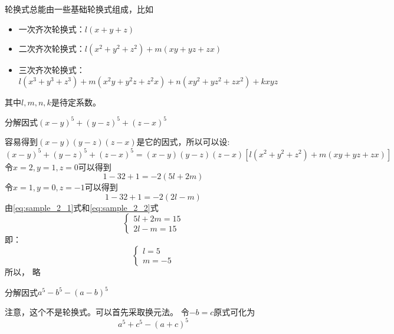 \documentclass[windows,csize4,answers]{BHCexam}
\begin{document}
\begin{groups}
\begin{questions}[]
        轮换式总能由一些基础轮换式组成，比如
        \begin{itemize}
            \item 一次齐次轮换式：$l(x+y+z)$
            \item 二次齐次轮换式：$l(x^2+y^2+z^2)+m(xy+yz+zx)$
            \item 三次齐次轮换式：$l(x^3+y^3+z^3)+m(x^2y+y^2z+z^2x)+n(xy^2+yz^2+zx^2)+kxyz$
        \end{itemize}
        其中$l,m,n,k$是待定系数。


        \question[5] 分解因式$(x-y)^5+(y-z)^5+(z-x)^5$
        \begin{solution}{0.5cm}
            \methodonly 容易得到$(x-y)(y-z)(z-x)$是它的因式，所以可以设:
            \[
                (x-y)^5+(y-z)^5+(z-x)^5=(x-y)(y-z)(z-x)[l(x^2+y^2+z^2)+m(xy+yz+zx)]
            \]
            令$x=2,y=1,z=0$可以得到
            \begin{equation}
                \label{eq:sample_2_1}
                1-32+1=-2(5l+2m)
            \end{equation}
            令$x=1,y=0,z=-1$可以得到
            \begin{equation}
                \label{eq:sample_2_2}
                1-32+1=-2(2l-m)
            \end{equation}
            由\ref{eq:sample_2_1}式和\ref{eq:sample_2_2}式
            \begin{equation}
                \begin{cases}
                    5l+2m=15 \\
                    2l-m=15
                \end{cases}
            \end{equation}
            即：
            \begin{equation}
                \begin{cases}
                    l=5 \\
                    m=-5
                \end{cases}
            \end{equation}
            所以， 略 
        \end{solution}
        \vspace{3.5cm}

        \question[5] 分解因式$a^5-b^5-(a-b)^5$
        \begin{solution}{0.5cm}
            注意，这个不是轮换式。可以首先采取换元法。
            \methodonly 令$-b=c$原式可化为
            \[
                a^5+c^5-(a+c)^5
            \]
        \end{solution}
        \vspace{3.5cm}

    \end{questions}
\end{groups}



\label{lastpage}
\end{document}

